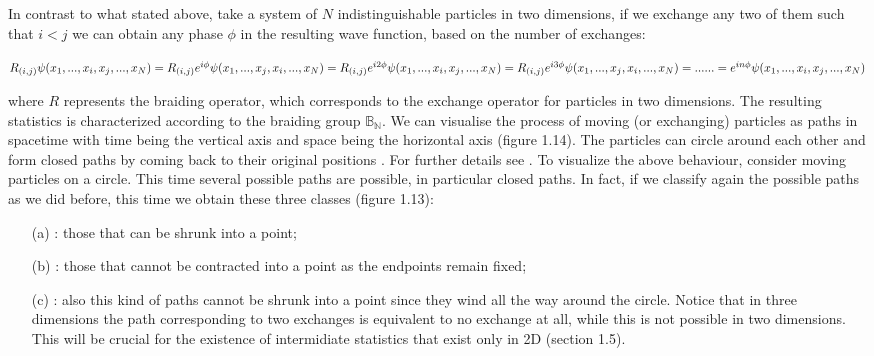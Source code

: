 \documentclass{Configuration_Files/PoliMi3i_thesis}
\begin{document}
	

In contrast to what stated above, take a system of $N$ indistinguishable particles in two dimensions, if we exchange any two of them such that $i<j$ we can obtain any phase $\phi$ in the resulting wave function, based on the number of exchanges:  

\begin{center}	
	$R_{(i,j)}\psi(x_1, ..., x_i,x_j, ..., x_N)=R_{(i,j)} e^{i\phi} \psi(x_1, ..., x_j,x_i, ..., x_N)= R_{(i,j)} e^{i2\phi} \psi(x_1, ..., x_i,x_j, ..., x_N)=R_{(i,j)} e^{i3\phi} \psi(x_1, ..., x_j,x_i, ..., x_N)= ... \ \newline
	... = e^{in\phi} \psi(x_1, ..., x_i,x_j, ..., x_N)$
\end{center}

where $R$ represents the braiding operator, which corresponds to the exchange operator for particles in two dimensions. The resulting statistics is characterized according to the braiding group  $\mathbb{B_N}$. We can visualise the process of moving (or exchanging) particles as paths in spacetime with time being the vertical axis and space being the horizontal axis (figure 1.14). The particles can circle around each other and form closed paths by coming back to their original positions {\cite{Wil91}}. For further details see {\cite{Rao16, Wil91}}.
To visualize the above behaviour, consider moving particles on a circle. This time several possible paths are possible, in particular closed paths. In fact, if we classify again the possible paths as we did before, this time we obtain these three classes (figure 1.13): 

\begin{itemize}
	\item[(a)] : those that can be shrunk into a point;

	\item[(b)] : those that cannot be contracted into a point as the endpoints remain fixed;

	\item[(c)] : also this kind of paths cannot be shrunk into a point since they wind all  the way around the circle. Notice that in three dimensions the path corresponding to two exchanges is equivalent to no exchange at all, while this is not possible in two dimensions. This will be crucial for the existence of intermidiate statistics that exist only in 2D (section 1.5).
\end{itemize}
\end{document}
